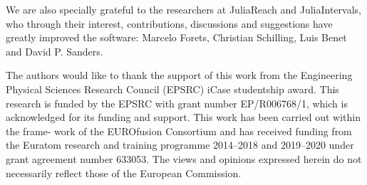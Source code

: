 \documentclass{juliacon}
\begin{document}
We are also specially grateful to the researchers at JuliaReach and JuliaIntervals, who through their interest, contributions, discussions and suggestions have greatly improved the software: Marcelo Forets, Christian Schilling, Luis Benet and David P. Sanders.

The authors would like to thank the support of this work from the Engineering Physical Sciences Research Council (EPSRC) iCase studentship award. This research is funded by the EPSRC with grant number EP/R006768/1, which is acknowledged for its funding and support. This work has been carried out within the frame- work of the EUROfusion Consortium and has received funding from the Euratom research and training programme 2014–2018 and 2019–2020 under grant agreement number 633053. The views and opinions expressed herein do not necessarily reflect those of the European Commission.


\end{document}
